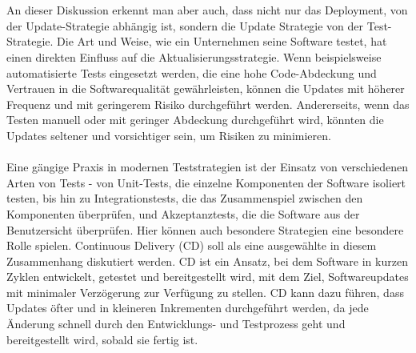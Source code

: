 \\\\ 
An dieser Diskussion erkennt man aber auch, dass nicht nur das Deployment, von der Update-Strategie abhängig ist, sondern die Update Strategie von der Test-Strategie. Die Art und Weise, wie ein Unternehmen seine Software testet, hat einen direkten Einfluss auf die Aktualisierungsstrategie. Wenn beispielsweise automatisierte Tests eingesetzt werden, die eine hohe Code-Abdeckung und Vertrauen in die Softwarequalität gewährleisten, können die Updates mit höherer Frequenz und mit geringerem Risiko durchgeführt werden. Andererseits, wenn das Testen manuell oder mit geringer Abdeckung durchgeführt wird, könnten die Updates seltener und vorsichtiger sein, um Risiken zu minimieren.
\\\\
Eine gängige Praxis in modernen Teststrategien ist der Einsatz von verschiedenen Arten von Tests - von Unit-Tests, die einzelne Komponenten der Software isoliert testen, bis hin zu Integrationstests, die das Zusammenspiel zwischen den Komponenten überprüfen, und Akzeptanztests, die die Software aus der Benutzersicht überprüfen.
Hier können auch besondere Strategien eine besondere Rolle spielen. Continuous Delivery (CD) soll als eine ausgewählte in diesem Zusammenhang diskutiert werden. CD ist ein Ansatz, bei dem Software in kurzen Zyklen entwickelt, getestet und bereitgestellt wird, mit dem Ziel, Softwareupdates mit minimaler Verzögerung zur Verfügung zu stellen. CD kann dazu führen, dass Updates öfter und in kleineren Inkrementen durchgeführt werden, da jede Änderung schnell durch den Entwicklungs- und Testprozess geht und bereitgestellt wird, sobald sie fertig ist.
